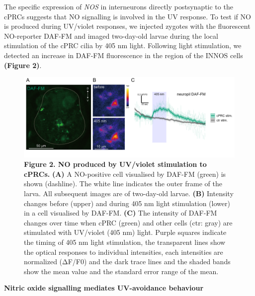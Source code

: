 \documentclass[
  10pt,
  onecolumn]{article}
\begin{document}
The specific expression of \emph{NOS} in interneurons directly
postsynaptic to the cPRCs suggests that NO signalling is involved in the
UV response. To test if NO is produced during UV/violet responses, we
injected zygotes with the fluorescent NO-reporter DAF-FM and imaged
two-day-old larvae during the local stimulation of the cPRC cilia by 405
nm light. Following light stimulation, we detected an increase in DAF-FM
fluorescence in the region of the INNOS cells \textbf{(Figure 2)}.

\begin{figure}
\centering
\includegraphics[width=1\textwidth,height=\textheight]{../figures/Fig2.png}
\caption{\textbf{Figure 2. NO produced by UV/violet stimulation to
cPRCs.} \textbf{(A)} A NO-positive cell visualised by DAF-FM (green) is
shown (dashline). The white line indicates the outer frame of the larva.
All subsequent images are of two-day-old larvae. \textbf{(B)} Intensity
changes before (upper) and during 405 nm light stimulation (lower) in a
cell visualised by DAF-FM. \textbf{(C)} The intensity of DAF-FM changes
over time when cPRC (green) and other cells (ctr: gray) are stimulated
with UV/violet (405 nm) light. Purple squares indicate the timing of 405
nm light stimulation, the transparent lines show the optical responses
to individual intensities, each intensities are normalized (ΔF/F0) and
the dark trace lines and the shaded bands show the mean value and the
standard error range of the mean.}
\end{figure}

\textbf{Nitric oxide signalling mediates UV-avoidance behaviour}
\end{document}

